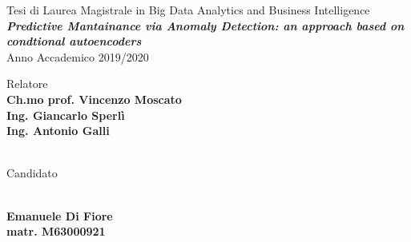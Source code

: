 \begin{titlepage}
\thispagestyle{empty}
\raggedright %


\vfill

{\large Tesi di Laurea Magistrale in Big Data Analytics and Business Intelligence}
\\[1cm]
{\textbf{\textit{\LARGE Predictive Mantainance via Anomaly Detection: an approach based on condtional autoencoders}}}
\\[1cm]
{\large Anno Accademico 2019/2020}

\vfill


\begin{table}[h]
Relatore
\\
\textbf{Ch.mo prof. Vincenzo Moscato}
\\
\textbf{Ing. Giancarlo Sperlì}
\\
\textbf{Ing. Antonio Galli}
\\ \\
{\raggedright Candidato}
\\
\textbf{Emanuele Di Fiore}
\\
\textbf{matr. M63000921}
\end{table}

\end{titlepage}